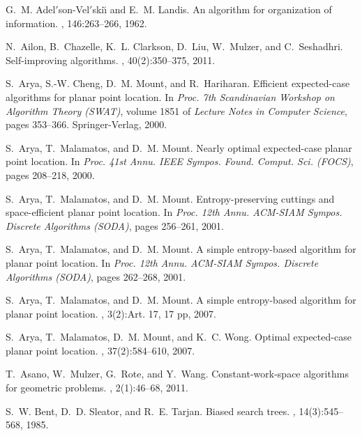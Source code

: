 \documentclass[11pt]{article}
\begin{document}
\newcommand{\SortNoop}[1]{}\def\cprime{$'$}
\begin{thebibliography}{10}

G.~M. Adel{\cprime}son-Vel{\cprime}ski{\u\i} and E.~M. Landis.
\newblock An algorithm for organization of information.
, 146:263--266, 1962.

N.~Ailon, B.~Chazelle, K.~L. Clarkson, D.~Liu, W.~Mulzer, and C.~Seshadhri.
\newblock Self-improving algorithms.
, 40(2):350--375, 2011.

S.~Arya, S.-W. Cheng, D.~M. Mount, and R.~Hariharan.
\newblock Efficient expected-case algorithms for planar point location.
\newblock In {\em Proc. 7th Scandinavian Workshop on Algorithm Theory (SWAT)},
  volume 1851 of {\em Lecture Notes in Computer Science}, pages 353--366.
  Springer-Verlag, 2000.

S.~Arya, T.~Malamatos, and D.~M. Mount.
\newblock Nearly optimal expected-case planar point location.
\newblock In {\em Proc. 41st Annu. IEEE Sympos. Found. Comput. Sci. (FOCS)},
  pages 208--218, 2000.

S.~Arya, T.~Malamatos, and D.~M. Mount.
\newblock Entropy-preserving cuttings and space-efficient planar point
  location.
\newblock In {\em Proc. 12th Annu. ACM-SIAM Sympos. Discrete Algorithms
  (SODA)}, pages 256--261, 2001.

S.~Arya, T.~Malamatos, and D.~M. Mount.
\newblock A simple entropy-based algorithm for planar point location.
\newblock In {\em Proc. 12th Annu. ACM-SIAM Sympos. Discrete Algorithms
  (SODA)}, pages 262--268, 2001.

S.~Arya, T.~Malamatos, and D.~M. Mount.
\newblock A simple entropy-based algorithm for planar point location.
, 3(2):Art. 17, 17 pp, 2007.

S.~Arya, T.~Malamatos, D.~M. Mount, and K.~C. Wong.
\newblock Optimal expected-case planar point location.
, 37(2):584--610, 2007.

T.~Asano, W.~Mulzer, G.~Rote, and Y.~Wang.
\newblock Constant-work-space algorithms for geometric problems.
, 2(1):46--68, 2011.

S.~W. Bent, D.~D. Sleator, and R.~E. Tarjan.
\newblock Biased search trees.
, 14(3):545--568, 1985.


\end{thebibliography}
\end{document}

